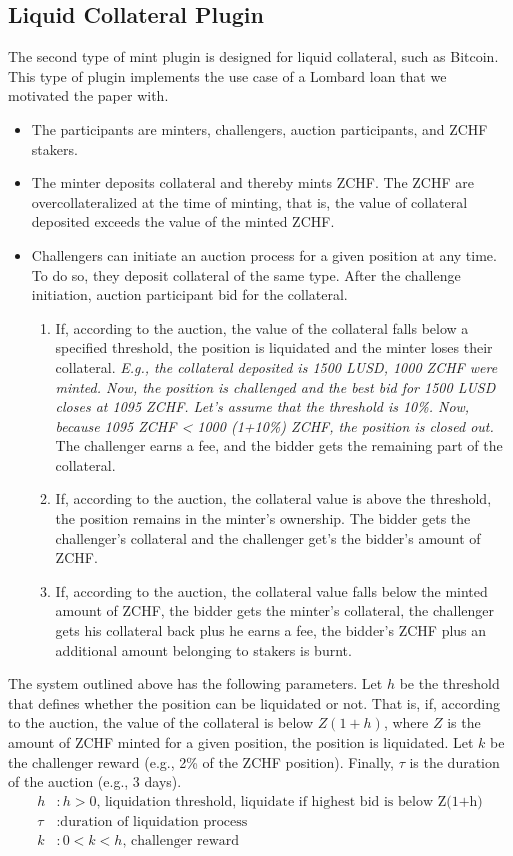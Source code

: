 \documentclass[english,11pt]{article}
\begin{document}
\subsection{Liquid Collateral Plugin}
The second type of mint plugin is designed for liquid collateral, such as
Bitcoin. This type of plugin implements the use case of a Lombard loan that
we motivated the paper with.
\begin{itemize}
\item The participants are minters, challengers, auction participants, and ZCHF stakers.
\item The minter deposits collateral and thereby mints ZCHF. The ZCHF are overcollateralized at the time
of minting, that is, the value of collateral deposited exceeds the value of the minted ZCHF.
\item Challengers can initiate an auction process for a given position at any time.
To do so, they deposit collateral of the same type. 
After the challenge initiation, auction participant bid for the collateral.
\begin{enumerate}
\item If, according to the auction, the value of the collateral falls below a specified threshold, the position is liquidated
and the minter loses their collateral. \emph{E.g., the collateral deposited is 1500 LUSD, 1000 ZCHF were minted. Now, the position
is challenged and the best bid for 1500 LUSD closes at 1095 ZCHF. Let's assume that the threshold is 10\%. Now, because 
1095 ZCHF < 1000 (1+10\%) ZCHF, the position is closed out.}
The challenger earns a fee, and the bidder gets the remaining part of the collateral.
\item If, according to the auction, the collateral value is above the threshold, the position remains in the minter's ownership. The bidder gets the challenger's collateral and
the challenger get's the bidder's amount of ZCHF.
\item If, according to the auction, the collateral value falls below the minted amount of ZCHF, the bidder gets the minter's collateral, the challenger gets his collateral back
plus he earns a fee, the bidder's ZCHF plus an additional amount belonging to stakers 
is burnt.
\end{enumerate}
\end{itemize}

The system outlined above has the following parameters. Let $h$ be the threshold that defines whether the position
can be liquidated or not. That is, if, according to the auction, the value of the collateral is below 
$Z(1+h)$, where $Z$ is the amount of ZCHF minted for a given position, the position is liquidated.
Let $k$ be the challenger reward (e.g., 2\% of the ZCHF position). Finally, $\tau$ is the duration of the auction
(e.g., 3 days).
\begin{align}
h &: \text{$h>0$, liquidation threshold, liquidate if highest bid is below Z(1+h)}\\
\tau &: \text{duration of liquidation process}\\
k &: \text{$0<k<h$, challenger reward}
\end{align}
\end{document}
